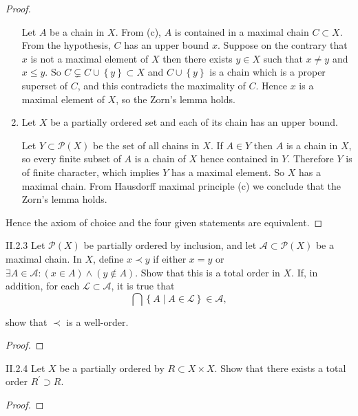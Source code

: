 \begin{proof}
\begin{enumerate}[label={(\alph*)}]
		      Let \( A \) be a chain in \( X \). From (c), \( A \) is contained in a maximal chain \( C \subset X \). From the hypothesis, \( C \) has an upper bound \( x \). Suppose on the contrary that \( x \) is not a maximal element of \( X \) then there exists \( y \in X \) such that \( x \ne y \) and \( x \leq y \). So \( C \subsetneq C \cup \left\{ y \right\} \subset X \) and \( C \cup \left\{ y \right\} \) is a chain which is a proper superset of \( C \), and this contradicts the maximality of \( C \). Hence \( x \) is a maximal element of \( X \), so the Zorn's lemma holds.
		\item Let \( X \) be a partially ordered set and each of its chain has an upper bound.

		      Let \( Y \subset \mathscr{P}(X) \) be the set of all chains in \( X \). If \( A \in Y \) then \( A \) is a chain in \( X \), so every finite subset of \( A \) is a chain of \( X \) hence contained in \( Y \). Therefore \( Y \) is of finite character, which implies \( Y \) has a maximal element. So \( X \) has a maximal chain. From Hausdorff maximal principle (c) we conclude that the Zorn's lemma holds.
	\end{enumerate}

	Hence the axiom of choice and the four given statements are equivalent.
\end{proof}

\begin{problem}{II.2.3}
Let \( \mathscr{P}(X) \) be partially ordered by inclusion, and let \( \mathscr{A} \subset \mathscr{P}(X) \) be a maximal chain. In \( X \), define \( x \prec y \) if either \( x = y \) or \( \exists A \in \mathscr{A}: (x \in A) \land (y \notin A) \). Show that this is a total order in \( X \). If, in addition, for each \( \mathscr{L} \subset \mathscr{A} \), it is true that
\[
	\bigcap \left\{ A \mid A \in \mathscr{L} \right\} \in \mathscr{A},
\]

show that \( \prec \) is a well-order.
\end{problem}

\begin{proof}
\end{proof}

\begin{problem}{II.2.4}
Let \(X\) be a partially ordered by \( R \subset X \times X \). Show that there exists a total order \( R^{\prime} \supset R \).
\end{problem}

\begin{proof}
\end{proof}

